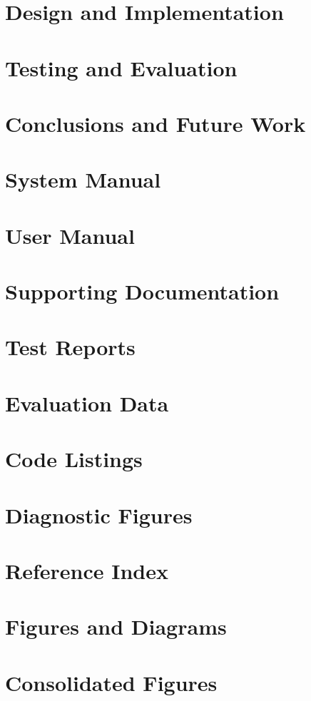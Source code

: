 \documentclass[12pt,a4paper,oneside]{report}
\begin{document}
\chapter{Design and Implementation}


\chapter{Testing and Evaluation}


\chapter{Conclusions and Future Work}


\printbibliography[heading=bibintoc,title={References}]

\appendix

\chapter{System Manual}


\chapter{User Manual}


\chapter{Supporting Documentation}


\chapter{Test Reports}


\chapter{Evaluation Data}


\chapter{Code Listings}


\chapter{Diagnostic Figures}


\chapter{Reference Index}


\chapter{Figures and Diagrams}


\chapter{Consolidated Figures}

\end{document}
